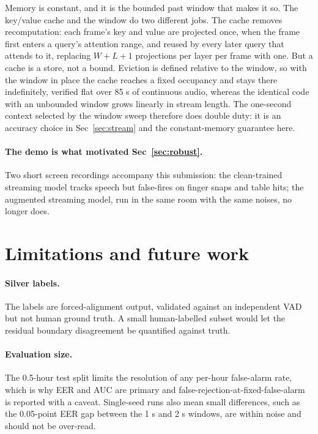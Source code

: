 \documentclass{article}
\begin{document}
Memory is constant, and it is the bounded past window that makes it so. The
key/value cache and the window do two different jobs. The cache removes
recomputation: each frame's key and value are projected once, when the frame
first enters a query's attention range, and reused by every later query that
attends to it, replacing $W + L + 1$ projections per layer per frame with one.
But a cache is a store, not a bound. Eviction is defined relative to the window,
so with the window in place the cache reaches a fixed occupancy and stays there
indefinitely, verified flat over 85 s of continuous audio, whereas the identical
code with an unbounded window grows linearly in stream length. The one-second
context selected by the window sweep therefore does double duty: it is an
accuracy choice in Sec~\ref{sec:stream} and the constant-memory guarantee here.


\paragraph{The demo is what motivated Sec~\ref{sec:robust}.} Two short screen recordings accompany this submission: the clean-trained streaming model tracks speech but false-fires on finger snaps and table hits; the augmented streaming model, run in the same room with the same noises, no longer does.

\section{Limitations and future work}
\label{sec:limits}

\paragraph{Silver labels.} The labels are forced-alignment output, validated against an independent VAD but not human ground truth. A small human-labelled subset would let the residual boundary disagreement be quantified against truth.

\paragraph{Evaluation size.} The 0.5-hour test split limits the resolution of any per-hour false-alarm rate, which is why EER and AUC are primary and false-rejection-at-fixed-false-alarm is reported with a caveat. Single-seed runs also mean small differences, such as the 0.05-point EER gap between the 1 s and 2 s windows, are within noise and should not be over-read.
\end{document}
